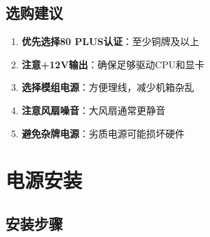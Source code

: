 \documentclass[12pt,UTF8]{ctexbook}
\begin{document}
\section{选购建议}

\begin{enumerate}
    \item \textbf{优先选择80 PLUS认证}：至少铜牌及以上
    \item \textbf{注意+12V输出}：确保足够驱动CPU和显卡
    \item \textbf{选择模组电源}：方便理线，减少机箱杂乱
    \item \textbf{注意风扇噪音}：大风扇通常更静音
    \item \textbf{避免杂牌电源}：劣质电源可能损坏硬件
\end{enumerate}

\chapter{电源安装}

\section{安装步骤}
\end{document}
